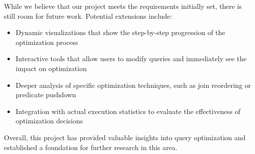 \documentclass[a4paper,12pt]{scrreprt}
\begin{document}
While we believe that our project meets the requirements initially set, there is still room for future work. Potential extensions include:
\begin{itemize}
    \item Dynamic visualizations that show the step-by-step progression of the optimization process
    \item Interactive tools that allow users to modify queries and immediately see the impact on optimization
    \item Deeper analysis of specific optimization techniques, such as join reordering or predicate pushdown
    \item Integration with actual execution statistics to evaluate the effectiveness of optimization decisions
\end{itemize}

Overall, this project has provided valuable insights into query optimization and established a foundation for further research in this area.

\appendix

\end{document}
